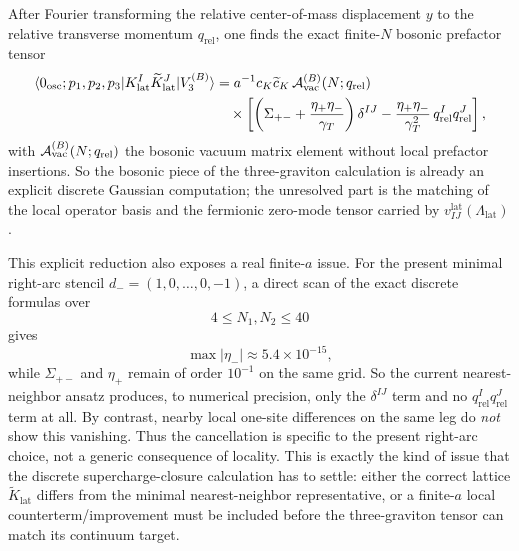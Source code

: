 \documentclass[11pt]{article}
\numberwithin{equation}{section}
\begin{document}
After Fourier transforming the relative center-of-mass displacement $y$ to the relative transverse momentum $q_{\mathrm{rel}}$, one finds the exact finite-$N$ bosonic prefactor tensor
\begin{equation}
\label{eq:s15-1-018}
\begin{aligned}
\langle 0_{\mathrm{osc}};p_1,p_2,p_3|
K^I_{\mathrm{lat}}\widetilde K^J_{\mathrm{lat}}
|V_3^{(B)}\rangle
&=
a^{-1}c_K\widetilde c_K\,
{\cal A}^{(B)}_{\mathrm{vac}}(N;q_{\mathrm{rel}})
\\
&\quad\times
\left[
\left(\Sigma_{+-}+\frac{\eta_+\eta_-}{\gamma_T}\right)\delta^{IJ}
-
\frac{\eta_+\eta_-}{\gamma_T^2}\,
q_{\mathrm{rel}}^I q_{\mathrm{rel}}^J
\right],
\end{aligned}
\end{equation}
with ${\cal A}^{(B)}_{\mathrm{vac}}(N;q_{\mathrm{rel}})$ the bosonic vacuum matrix element without local prefactor insertions. So the bosonic piece of the three-graviton calculation is already an explicit discrete Gaussian computation; the unresolved part is the matching of the local operator basis and the fermionic zero-mode tensor carried by $v^{\mathrm{lat}}_{IJ}(\Lambda_{\mathrm{lat}})$.

This explicit reduction also exposes a real finite-$a$ issue. For the present minimal right-arc stencil $d_-=(1,0,\dots,0,-1)$, a direct scan of the exact discrete formulas over
\begin{equation}
\label{eq:s15-1-019}
4\le N_1,N_2\le 40
\end{equation}
gives
\begin{equation}
\label{eq:s15-1-020}
\max |\eta_-| \approx 5.4\times 10^{-15},
\end{equation}
while $\Sigma_{+-}$ and $\eta_+$ remain of order $10^{-1}$ on the same grid. So the current nearest-neighbor ansatz produces, to numerical precision, only the $\delta^{IJ}$ term and no $q_{\mathrm{rel}}^Iq_{\mathrm{rel}}^J$ term at all. By contrast, nearby local one-site differences on the same leg do \emph{not} show this vanishing. Thus the cancellation is specific to the present right-arc choice, not a generic consequence of locality. This is exactly the kind of issue that the discrete supercharge-closure calculation has to settle: either the correct lattice $\widetilde K_{\mathrm{lat}}$ differs from the minimal nearest-neighbor representative, or a finite-$a$ local counterterm/improvement must be included before the three-graviton tensor can match its continuum target.
\end{document}
